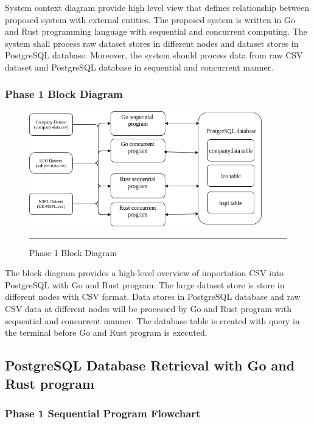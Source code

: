 System context diagram provide high level view that defines relationship between proposed system with external entities. The proposed system is written in Go and Rust programming language with sequential and concurrent computing. The system shall process raw dataset stores in different nodes and dataset stores in PostgreSQL database. Moreover, the system should process data from raw CSV dataset and PostgreSQL database in sequential and concurrent manner. 

\subsubsection{Phase 1 Block Diagram}

\begin{figure}[H]
	\centering
	\includegraphics[width=0.9\textwidth]{Figure/block-diagram.png}
	\rule{35em}{0.5pt}
	\caption[Phase 1 Block Diagram]{Phase 1 Block Diagram}
\end{figure}

The block diagram provides a high-level overview of importation CSV into PostgreSQL with Go and Rust program. The large dataset store is store in different nodes with CSV format. Data stores in PostgreSQL database and raw CSV data at different nodes will be processed by Go and Rust program with sequential and concurrent manner. The database table is created with query in the terminal before Go and Rust program is executed.

\subsection{PostgreSQL Database Retrieval with Go and Rust program}

\subsubsection{Phase 1 Sequential Program Flowchart}

